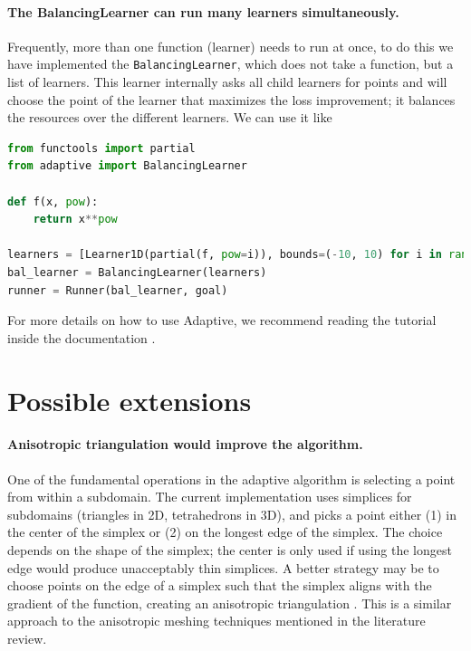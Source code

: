 \documentclass[english, twocolumn, 10pt, aps, superscriptaddress, floatfix, prb, citeautoscript]{revtex4-1}
\renewcommand{\citep}{\cite}
\newcommand{\passthrough}[1]{\lstset{mathescape=false}#1\lstset{mathescape=true}}
\begin{document}
\paragraph{The BalancingLearner can run many learners simultaneously.}

Frequently, more than one function (learner) needs to run at once, to do this we have implemented the \passthrough{\lstinline!BalancingLearner!}, which does not take a function, but a list of learners.
This learner internally asks all child learners for points and will choose the point of the learner that maximizes the loss improvement; it balances the resources over the different learners.
We can use it like

\begin{lstlisting}[language=Python]
from functools import partial
from adaptive import BalancingLearner

def f(x, pow):
    return x**pow

learners = [Learner1D(partial(f, pow=i)), bounds=(-10, 10) for i in range(2, 10)]
bal_learner = BalancingLearner(learners)
runner = Runner(bal_learner, goal)
\end{lstlisting}

For more details on how to use Adaptive, we recommend reading the tutorial inside the documentation \citep{Nijholt2018}.

\section{Possible extensions}

\paragraph{Anisotropic triangulation would improve the algorithm.}

One of the fundamental operations in the adaptive algorithm is selecting a point from within a subdomain.
The current implementation uses simplices for subdomains (triangles in 2D, tetrahedrons in 3D), and picks a point either (1) in the center of the simplex or (2) on the longest edge of the simplex.
The choice depends on the shape of the simplex; the center is only used if using the longest edge would produce unacceptably thin simplices.
A better strategy may be to choose points on the edge of a simplex such that the simplex aligns with the gradient of the function, creating an anisotropic triangulation \citep{Dyn1990}.
This is a similar approach to the anisotropic meshing techniques mentioned in the literature review.
\end{document}
